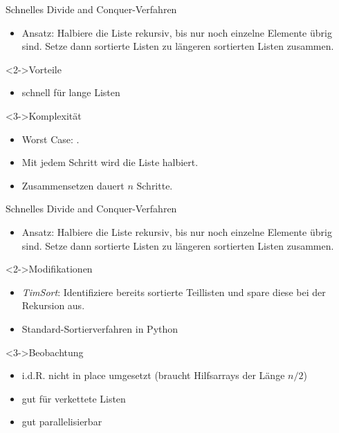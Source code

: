 \begin{frame}
    \begin{block}{Schnelles \alert{Divide and Conquer}-Verfahren}
        \begin{itemize}
            \item Ansatz: Halbiere die Liste rekursiv, bis nur noch einzelne Elemente übrig sind.
                          Setze dann sortierte Listen zu längeren sortierten Listen zusammen.
        \end{itemize}
    \end{block}
    \begin{block}<2->{Vorteile}
        \begin{itemize}
            \item schnell für lange Listen
        \end{itemize}
    \end{block}
    \begin{block}<3->{Komplexität}
        \begin{itemize}
            \item Worst Case: \alert{\onlog}.
            \item Mit jedem Schritt wird die Liste halbiert.
            \item Zusammensetzen dauert $n$ Schritte.
        \end{itemize}
    \end{block}
\end{frame}

\begin{frame}
    \begin{block}{Schnelles \alert{Divide and Conquer}-Verfahren}
        \begin{itemize}
            \item Ansatz: Halbiere die Liste rekursiv, bis nur noch einzelne Elemente übrig sind.
                          Setze dann sortierte Listen zu längeren sortierten Listen zusammen.
        \end{itemize}
    \end{block}
    \begin{block}<2->{Modifikationen}
        \begin{itemize}
            \item \emph{TimSort}: Identifiziere bereits sortierte Teillisten und spare diese bei der Rekursion aus.
            \item Standard-Sortierverfahren in Python
        \end{itemize}
    \end{block}
    \begin{block}<3->{Beobachtung}
        \begin{itemize}
            \item i.d.R. nicht in place umgesetzt (braucht Hilfsarrays der Länge $n/2$)
            \item gut für verkettete Listen
            \item gut parallelisierbar
        \end{itemize}
    \end{block}
\end{frame}

